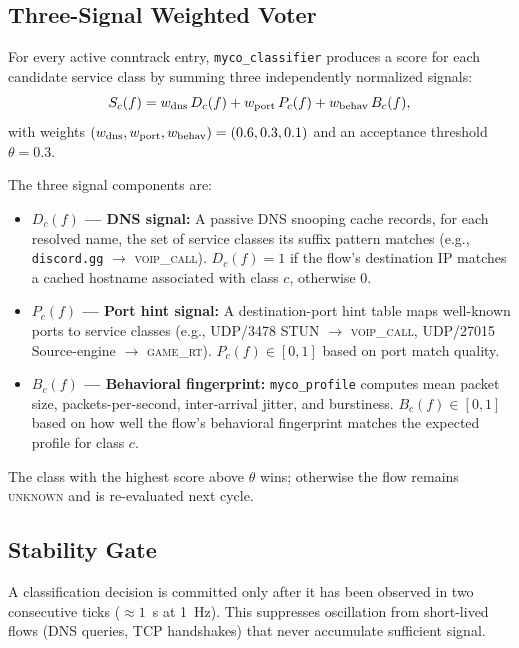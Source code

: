 \subsection{Three-Signal Weighted Voter}

For every active conntrack entry, \texttt{myco\_classifier} produces a score for each candidate service class by summing three independently normalized signals:
\begin{equation}
  S_c(f) = w_{\rm dns}\,D_c(f) + w_{\rm port}\,P_c(f) + w_{\rm behav}\,B_c(f),
  \label{eq:voter}
\end{equation}
with weights $(w_{\rm dns}, w_{\rm port}, w_{\rm behav}) = (0.6, 0.3, 0.1)$ and an acceptance threshold $\theta = 0.3$.

The three signal components are:

\begin{itemize}
  \item \textbf{$D_c(f)$ --- DNS signal:} A passive DNS snooping cache records, for each resolved name, the set of service classes its suffix pattern matches (e.g., \texttt{discord.gg} $\to$ \textsc{voip\_call}). $D_c(f) = 1$ if the flow's destination IP matches a cached hostname associated with class $c$, otherwise 0.
  \item \textbf{$P_c(f)$ --- Port hint signal:} A destination-port hint table maps well-known ports to service classes (e.g., UDP/3478 STUN $\to$ \textsc{voip\_call}, UDP/27015 Source-engine $\to$ \textsc{game\_rt}). $P_c(f) \in [0, 1]$ based on port match quality.
  \item \textbf{$B_c(f)$ --- Behavioral fingerprint:} \texttt{myco\_profile} computes mean packet size, packets-per-second, inter-arrival jitter, and burstiness. $B_c(f) \in [0, 1]$ based on how well the flow's behavioral fingerprint matches the expected profile for class $c$.
\end{itemize}

The class with the highest score above $\theta$ wins; otherwise the flow remains \textsc{unknown} and is re-evaluated next cycle.

\subsection{Stability Gate}

A classification decision is committed only after it has been observed in two consecutive ticks ($\approx 1$~s at 1~Hz). This suppresses oscillation from short-lived flows (DNS queries, TCP handshakes) that never accumulate sufficient signal.

